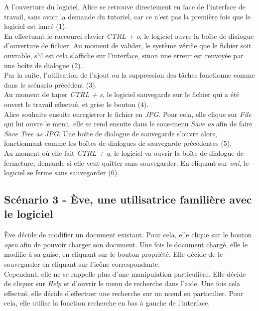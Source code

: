\documentclass[12pt, a4paper]{article}
\begin{document}
A l'ouverture du logiciel, Alice se retrouve directement en face de l'interface de travail, sans avoir la demande du tutoriel, car ce n'est pas la première fois que le logiciel est lancé (1).\\


En effectuant le raccourci clavier \emph{CTRL + o}, le logiciel ouvre la boîte de dialogue d'ouverture de fichier. Au moment de valider, le système vérifie que le fichier soit ouvrable, s’il est cela s'affiche sur l'interface, sinon une erreur est renvoyée par une boîte de dialogue (2).\\


Par la suite, l'utilisation de l'ajout ou la suppression des tâches fonctionne comme dans le scénario précédent (3).\\


Au moment de taper \emph{CTRL + s}, le logiciel sauvegarde sur le fichier qui a été ouvert le travail effectué, et grise le bouton (4). \\


Alice souhaite ensuite enregistrer le fichier en \emph{JPG}. Pour cela, elle clique sur \emph{File} qui lui ouvre le menu, elle se rend ensuite dans le sous-menu \emph{Save as} afin de faire \emph{Save Tree as JPG}. Une boîte de dialogue de sauvegarde s'ouvre alors, fonctionnant comme les boîtes de dialogues de sauvegarde précédentes (5).\\


Au moment où elle fait \emph{CTRL + q}, le logiciel va ouvrir la boîte de dialogue de fermeture, demande si elle veut quitter sans sauvegarder. En cliquant sur \emph{oui}, le logiciel se ferme sans sauvegarder (6).\newpage


\textcolor{NavyBlue}{\subsection{Scénario 3 - Ève, une utilisatrice familière avec le logiciel}}


Ève décide de modifier un document existant. Pour cela, elle clique sur le bouton \emph{open} afin de pouvoir charger son document. Une fois le document chargé, elle le modifie à sa guise, en cliquant sur le bouton propriété. Elle décide de le sauvegarder en cliquant sur l'icône correspondante.\\


Cependant, elle ne se rappelle plus d'une manipulation particulière. Elle décide de cliquer sur \emph{Help} et d'ouvrir le menu de recherche dans l'aide. Une fois cela effectué, elle décide d’effectuer une recherche sur un nœud en particulier. Pour cela, elle utilise la fonction recherche en bas à gauche de l'interface. \\
\end{document}
